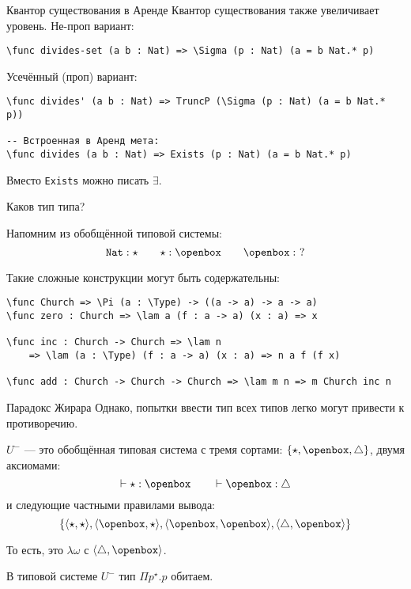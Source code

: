 \documentclass[aspectratio=169,dvipsnames,usenames]{beamer}
\begin{document}
\begin{frame}[fragile]{Квантор существования в Аренде}
Квантор существования также увеличивает уровень. Не-проп вариант:

\small\color[HTML]{025002}
\begin{verbatim}
\func divides-set (a b : Nat) => \Sigma (p : Nat) (a = b Nat.* p)
\end{verbatim}
\normalsize\color{black}

Усечённый (проп) вариант:

\small\color[HTML]{025002}
\begin{verbatim}
\func divides' (a b : Nat) => TruncP (\Sigma (p : Nat) (a = b Nat.* p))

-- Встроенная в Аренд мета:
\func divides (a b : Nat) => Exists (p : Nat) (a = b Nat.* p)
\end{verbatim}
\normalsize\color{black}

Вместо \verb!Exists! можно писать $\exists$.

\end{frame}

\begin{frame}[fragile]{Каков тип типа?}

Напомним из обобщённой типовой системы:
$$\texttt{Nat} : \star\quad\quad\star : \openbox\quad\quad\openbox :\ ?$$

Такие сложные конструкции могут быть содержательны:
\small\color[HTML]{025002}
\begin{verbatim}
\func Church => \Pi (a : \Type) -> ((a -> a) -> a -> a)
\func zero : Church => \lam a (f : a -> a) (x : a) => x

\func inc : Church -> Church => \lam n 
    => \lam (a : \Type) (f : a -> a) (x : a) => n a f (f x)

\func add : Church -> Church -> Church => \lam m n => m Church inc n
\end{verbatim}
\normalsize\color{black}

\end{frame}

\begin{frame}{Парадокс Жирара}
Однако, попытки ввести тип всех типов легко могут привести к противоречию.

\begin{dfn}[система $U^-$]
$U^-$ --- это обобщённая типовая система с тремя сортами: $\{\star,\openbox,\triangle\}$,
двумя аксиомами: $$\vdash \star : \openbox\quad\quad\vdash \openbox : \triangle$$
и следующие частными правилами вывода: $$\{\langle \star,\star\rangle, \langle \openbox,\star\rangle,
        \langle \openbox,\openbox\rangle, \langle \triangle,\openbox\rangle\}$$
\end{dfn}

То есть, это $\lambda\omega$ с $\langle \triangle,\openbox\rangle$.

\begin{thm}
В типовой системе $U^-$ тип $\Pi p^\star.p$ обитаем.
\end{thm}
\end{frame}
\end{document}
